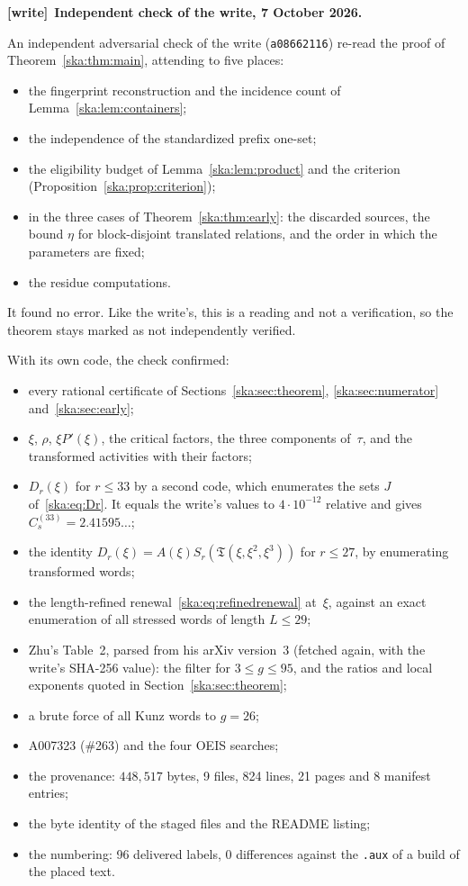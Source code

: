 \documentclass[11pt,letterpaper]{article}
\theoremstyle{definition}
\newcommand{\file}[1]{\nolinkurl{#1}}
\newenvironment{writenote}[1][]{\par\smallskip\begingroup\small
 \noindent\textbf{[write]}\if\relax\detokenize{#1}\relax\else~\textbf{#1.}\fi\ }%
 {\par\endgroup\smallskip}
\begin{document}
\endgroup
\begin{writenote}[Independent check of the write, 7 October 2026]\raggedright
An independent adversarial check of the write (\file{a08662116}) re-read the proof of
Theorem~\ref{ska:thm:main}, attending to five places:
\begin{itemize}\raggedright
\item the fingerprint reconstruction and the incidence count of Lemma~\ref{ska:lem:containers};
\item the independence of the standardized prefix one-set;
\item the eligibility budget of Lemma~\ref{ska:lem:product} and the criterion
(Proposition~\ref{ska:prop:criterion});
\item in the three cases of Theorem~\ref{ska:thm:early}: the discarded sources, the bound $\eta$ for
block-disjoint translated relations, and the order in which the parameters are fixed;
\item the residue computations.
\end{itemize}
It found no error. Like the write's, this is a reading and not a verification, so the theorem stays marked as
not independently verified.

With its own code, the check confirmed:
\begin{itemize}\raggedright
\item every rational certificate of Sections~\ref{ska:sec:theorem}, \ref{ska:sec:numerator}
and~\ref{ska:sec:early};
\item $\xi$, $\rho$, $\xi P'(\xi)$, the critical factors, the three components of~$\tau$, and the transformed
activities with their factors;
\item $D_r(\xi)$ for $r\le33$ by a second code, which enumerates the sets $J$ of~\eqref{ska:eq:Dr}. It equals the
write's values to $4\cdot10^{-12}$ relative and gives $C_s^{(33)}=2.41595\ldots$;
\item the identity $D_r(\xi)=A(\xi)S_r(\mathfrak T(\xi,\xi^2,\xi^3))$ for $r\le27$, by enumerating transformed words;
\item the length-refined renewal~\eqref{ska:eq:refinedrenewal} at~$\xi$, against an exact enumeration of all
stressed words of length $L\le29$;
\item Zhu's Table~2, parsed from his arXiv version~3 (fetched again, with the write's SHA-256 value): the filter
for $3\le g\le95$, and the ratios and local exponents quoted in Section~\ref{ska:sec:theorem};
\item a brute force of all Kunz words to $g=26$;
\item A007323 (\#263) and the four OEIS searches;
\item the provenance: $448{,}517$ bytes, 9 files, 824 lines, 21 pages and 8 manifest entries;
\item the byte identity of the staged files and the README listing;
\item the numbering: 96 delivered labels, 0 differences against the \file{.aux} of a build of the placed text.
\end{itemize}


\end{writenote}
\end{document}
